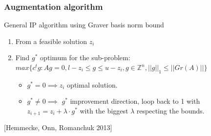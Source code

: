 \documentclass{beamer}
\begin{document}
    \begin{frame}
        \frametitle{Augmentation algorithm}

        \begin{block}{\centering General IP algorithm using Graver basis norm bound}
        \begin{enumerate}
            \item From a feasible solution $z_i$
            \item Find $g^*$ optimum for the sub-problem: \vspace{4pt}\\
                  $max\{c^tg : Ag = 0, l-z_i \leq g \leq u-z_i, g \in \mathbb{Z}^n, ||g||_1 \leq ||Gr(A)|| \}$ \vspace{4pt}
            \begin{itemize}
                \item $g^* = 0 \implies z_i$ optimal solution.
                \item $g^* \neq 0 \implies$ $g^*$ improvement direction, loop back to 1 with $z_{i+1} = z_i + \lambda \cdot g^*$ with the biggest $\lambda$ respecting the bounds.
            \end{itemize}
        \end{enumerate}
        \end{block}
        [Hemmecke, Onn, Romanchuk 2013]
    \end{frame}
    
\end{document}
